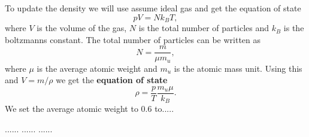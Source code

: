 \documentclass{article}
\begin{document}
To update the density we will use assume ideal gas and get the equation of state
\begin{equation*}
    pV = Nk_B T,
\end{equation*}
where $V$ is the volume of the gas, $N$ is the total number of particles and $k_B$ is the boltzmanns constant. The total number of particles can be written as
\begin{equation*}
    N=\frac{m}{\mu m_u},
\end{equation*}
where $\mu$ is the average atomic weight and $m_u$ is the atomic mass unit. Using this and $V=m/\rho$ we get the \textbf{equation of state}
\begin{equation}\label{eq:eos}
    \rho = \frac{p}{T}\frac{m_u \mu}{k_B}.
\end{equation}
We set the average atomic weight to $0.6$ to.....


......
......
......





\end{document}
